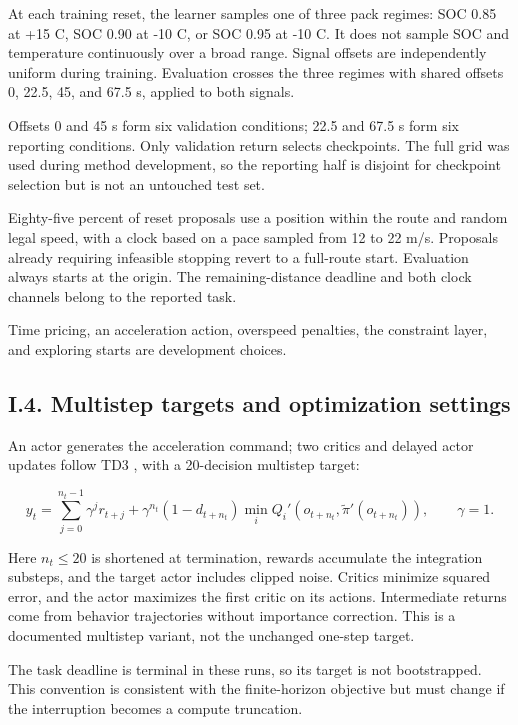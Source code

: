\documentclass[letterpaper,journal,onecolumn]{IEEEtran}
\begin{document}
At each training reset, the learner samples one of three pack regimes: SOC 0.85 at +15 \textdegree{}C, SOC 0.90 at -10 \textdegree{}C, or SOC 0.95 at -10 \textdegree{}C. It does not sample SOC and temperature continuously over a broad range. Signal offsets are independently uniform during training. Evaluation crosses the three regimes with shared offsets 0, 22.5, 45, and 67.5 s, applied to both signals.

Offsets 0 and 45 s form six validation conditions; 22.5 and 67.5 s form six reporting conditions. Only validation return selects checkpoints. The full grid was used during method development, so the reporting half is disjoint for checkpoint selection but is not an untouched test set.

Eighty-five percent of reset proposals use a position within the route and random legal speed, with a clock based on a pace sampled from 12 to 22 m/s. Proposals already requiring infeasible stopping revert to a full-route start. Evaluation always starts at the origin. The remaining-distance deadline and both clock channels belong to the reported task.

Time pricing, an acceleration action, overspeed penalties, the constraint layer, and exploring starts are development choices.

\subsection*{I.4. Multistep targets and optimization settings}

An actor generates the acceleration command; two critics and delayed actor updates follow TD3 \cite{R-TD3}, with a 20-decision multistep target:

\[y_t=\sum_{j=0}^{n_t-1}\gamma^jr_{t+j}+
\gamma^{n_t}(1-d_{t+n_t})\min_i Q_i'(o_{t+n_t},\widetilde\pi'(o_{t+n_t})),\qquad \gamma=1.\]

Here \(n_t\le20\) is shortened at termination, rewards accumulate the integration substeps, and the target actor includes clipped noise. Critics minimize squared error, and the actor maximizes the first critic on its actions. Intermediate returns come from behavior trajectories without importance correction. This is a documented multistep variant, not the unchanged one-step target.

The task deadline is terminal in these runs, so its target is not bootstrapped. This convention is consistent with the finite-horizon objective but must change if the interruption becomes a compute truncation.
\end{document}
